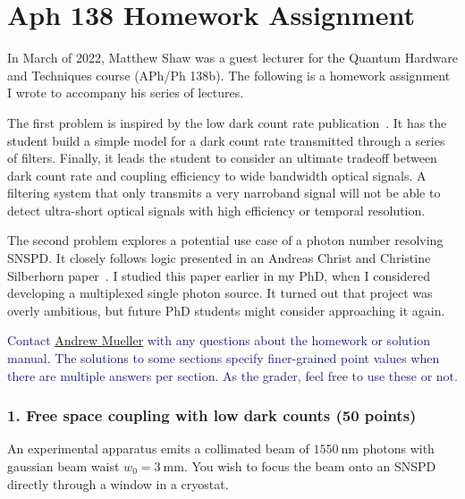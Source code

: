 \documentclass[11pt]{caltech_thesis} %
\begin{document}
\appendix

\hypertarget{aph-138-homework-assignment}{%
\chapter{Aph 138 Homework Assignment}\label{aph-138-homework-assignment}}

In March of 2022, Matthew Shaw was a guest lecturer for the Quantum Hardware and Techniques course (APh/Ph 138b). The following is a homework assignment I wrote to accompany his series of lectures.

The first problem is inspired by the low dark count rate publication~\autocite{Mueller:21}. It has the student build a simple model for a dark count rate transmitted through a series of filters. Finally, it leads the student to consider an ultimate tradeoff between dark count rate and coupling efficiency to wide bandwidth optical signals. A filtering system that only transmits a very narroband signal will not be able to detect ultra-short optical signals with high efficiency or temporal resolution.

The second problem explores a potential use case of a photon number resolving SNSPD. It closely follows logic presented in an Andreas Christ and Christine Silberhorn paper~\autocite{Andreas:12}. I studied this paper earlier in my PhD, when I considered developing a multiplexed single photon source. It turned out that project was overly ambitious, but future PhD students might consider approaching it again.

\textcolor{midnightblue}{Contact \href{mailto:andrewstermueller@gmail.com}{Andrew Mueller} with any questions about the homework or solution manual. The solutions to some sections specify finer-grained point values when there are multiple answers per section. As the grader, feel free to use these or not. }

\hypertarget{free-space-coupling-with-low-dark-counts-50-points}{%
\subsection{1. Free space coupling with low dark counts (50 points)}\label{free-space-coupling-with-low-dark-counts-50-points}}

An experimental apparatus emits a collimated beam of $1550~\mathrm{nm}$ photons with gaussian beam waist $w_0 = 3~\mathrm{mm}$. You wish to focus the beam onto an SNSPD directly through a window in a cryostat.
\end{document}
